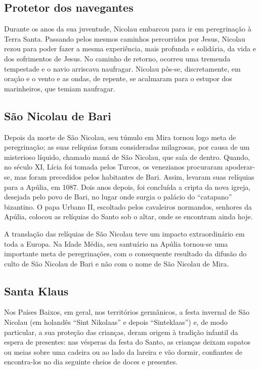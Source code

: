 \documentclass[11pt]{article}
\begin{document}
\begin{justify}
\subsection{Protetor dos navegantes}

Durante os anos da sua juventude, Nicolau embarcou para ir em peregrinação à Terra Santa. Passando pelos mesmos caminhos percorridos por Jesus, Nicolau rezou para poder fazer a mesma experiência, mais profunda e solidária, da vida e dos sofrimentos de Jesus. No caminho de retorno, ocorreu uma tremenda tempestade e o navio arriscava naufragar. Nicolau pôs-se, discretamente, em oração e o vento e as ondas, de repente, se acalmaram para o estupor dos marinheiros, que temiam naufragar.

\subsection{São Nicolau de Bari}

Depois da morte de São Nicolau, seu túmulo em Mira tornou logo meta de peregrinação; as suas relíquias foram consideradas milagrosas, por causa de um misterioso líquido, chamado maná de São Nicolau, que saía de dentro. Quando, no século XI, Lícia foi tomada pelos Turcos, os venezianos procuraram apoderar-se, mas foram precedidos pelos habitantes de Bari. Assim, levaram suas relíquias para a Apúlia, em 1087. Dois anos depois, foi concluída a cripta da nova igreja, desejada pelo povo de Bari, no lugar onde surgia o palácio do “catapano” bizantino. O papa Urbano II, escoltado pelos cavaleiros normandos, senhores da Apúlia, colocou as relíquias do Santo sob o altar, onde se encontram ainda hoje.

A translação das relíquias de São Nicolau teve um impacto extraordinário em toda a Europa. Na Idade Média, seu santuário na Apúlia tornou-se uma importante meta de peregrinações, com o consequente resultado da difusão do culto de São Nicolau de Bari e não com o nome de São Nicolau de Mira.

\subsection{Santa Klaus}

Nos Países Baixos, em geral, nos territórios germânicos, a festa invernal de São Nicolau (em holandês “Sint Nikolaas” e depois “Sinteklaas”) e, de modo particular, a sua proteção das crianças, deram origem à tradição infantil da espera de presentes: nas vésperas da festa do Santo, as crianças deixam sapatos ou meias sobre uma cadeira ou ao lado da lareira e vão dormir, confiantes de encontra-los no dia seguinte cheios de doces e presentes.

 

\end{justify}
\end{document}
